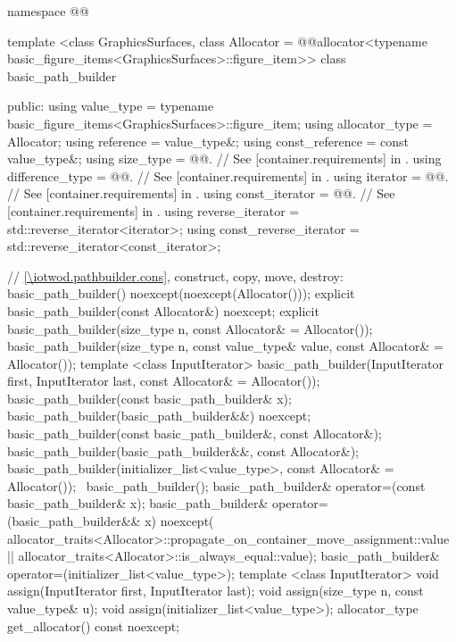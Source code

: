 \begin{codeblock}
namespace @\fullnamespace{}@ {
  template <class GraphicsSurfaces,
            class Allocator = @\stdqualifier{}@allocator<typename
              basic_figure_items<GraphicsSurfaces>::figure_item>>
  class basic_path_builder {
  public:
    using value_type             = typename basic_figure_items<GraphicsSurfaces>::figure_item;
    using allocator_type         = Allocator;
    using reference              = value_type&;
    using const_reference        = const value_type&;
    using size_type              = @@. // See [container.requirements] in \CppXVII.
    using difference_type        = @@. // See [container.requirements] in \CppXVII.
    using iterator               = @@. // See [container.requirements] in \CppXVII.
    using const_iterator         = @@. // See [container.requirements] in \CppXVII.
    using reverse_iterator       = std::reverse_iterator<iterator>;
    using const_reverse_iterator = std::reverse_iterator<const_iterator>;

    // \ref{\iotwod.pathbuilder.cons}, construct, copy, move, destroy:
    basic_path_builder() noexcept(noexcept(Allocator()));
    explicit basic_path_builder(const Allocator&) noexcept;
    explicit basic_path_builder(size_type n, const Allocator& = Allocator());
    basic_path_builder(size_type n, const value_type& value, const Allocator& = Allocator());
    template <class InputIterator>
    basic_path_builder(InputIterator first, InputIterator last, const Allocator& = Allocator());
    basic_path_builder(const basic_path_builder& x);
    basic_path_builder(basic_path_builder&&) noexcept;
    basic_path_builder(const basic_path_builder&, const Allocator&);
    basic_path_builder(basic_path_builder&&, const Allocator&);
    basic_path_builder(initializer_list<value_type>, const Allocator& = Allocator());
    ~basic_path_builder();
    basic_path_builder& operator=(const basic_path_builder& x);
    basic_path_builder& operator=(basic_path_builder&& x) noexcept(
      allocator_traits<Allocator>::propagate_on_container_move_assignment::value ||
      allocator_traits<Allocator>::is_always_equal::value);
    basic_path_builder& operator=(initializer_list<value_type>);
    template <class InputIterator>
    void assign(InputIterator first, InputIterator last);
    void assign(size_type n, const value_type& u);
    void assign(initializer_list<value_type>);
    allocator_type get_allocator() const noexcept;

}}
\end{codeblock}
